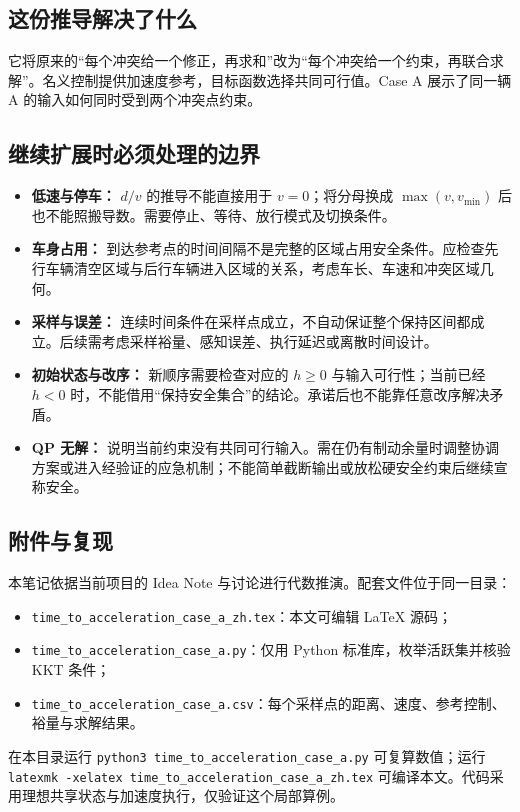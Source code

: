 \documentclass[UTF8,fontset=fandol,11pt,a4paper]{ctexart}
\begin{document}
\subsection{这份推导解决了什么}
它将原来的“每个冲突给一个修正，再求和”改为“每个冲突给一个约束，再联合求解”。名义控制提供加速度参考，目标函数选择共同可行值。Case A 展示了同一辆 A 的输入如何同时受到两个冲突点约束。

\subsection{继续扩展时必须处理的边界}
\begin{itemize}
\item \textbf{低速与停车：} $d/v$ 的推导不能直接用于 $v=0$；将分母换成 $\max(v,v_{\min})$ 后也不能照搬导数。需要停止、等待、放行模式及切换条件。
\item \textbf{车身占用：} 到达参考点的时间间隔不是完整的区域占用安全条件。应检查先行车辆清空区域与后行车辆进入区域的关系，考虑车长、车速和冲突区域几何。
\item \textbf{采样与误差：} 连续时间条件在采样点成立，不自动保证整个保持区间都成立。后续需考虑采样裕量、感知误差、执行延迟或离散时间设计。
\item \textbf{初始状态与改序：} 新顺序需要检查对应的 $h\geq0$ 与输入可行性；当前已经 $h<0$ 时，不能借用“保持安全集合”的结论。承诺后也不能靠任意改序解决矛盾。
\item \textbf{QP 无解：} 说明当前约束没有共同可行输入。需在仍有制动余量时调整协调方案或进入经验证的应急机制；不能简单截断输出或放松硬安全约束后继续宣称安全。
\end{itemize}

\subsection{附件与复现}
本笔记依据当前项目的 Idea Note 与讨论进行代数推演。配套文件位于同一目录：
\begin{itemize}
\item \texttt{time\_to\_acceleration\_case\_a\_zh.tex}：本文可编辑 LaTeX 源码；
\item \texttt{time\_to\_acceleration\_case\_a.py}：仅用 Python 标准库，枚举活跃集并核验 KKT 条件；
\item \texttt{time\_to\_acceleration\_case\_a.csv}：每个采样点的距离、速度、参考控制、裕量与求解结果。
\end{itemize}
在本目录运行 \texttt{python3 time\_to\_acceleration\_case\_a.py} 可复算数值；运行 \texttt{latexmk -xelatex time\_to\_acceleration\_case\_a\_zh.tex} 可编译本文。代码采用理想共享状态与加速度执行，仅验证这个局部算例。
\newpage
\end{document}
